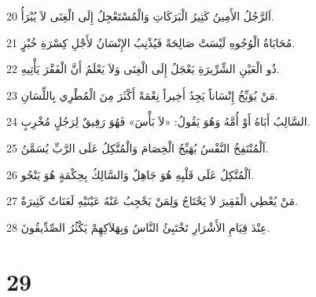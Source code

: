 \par 20 اَلرَّجُلُ الأَمِينُ كَثِيرُ الْبَرَكَاتِ وَالْمُسْتَعْجِلُ إِلَى الْغِنَى لاَ يُبْرَأُ.
\par 21 مُحَابَاةُ الْوُجُوهِ لَيْسَتْ صَالِحَةً فَيُذْنِبُ الإِنْسَانُ لأَجْلِ كِسْرَةِ خُبْزٍ.
\par 22 ذُو الْعَيْنِ الشِّرِّيرَةِ يَعْجَلُ إِلَى الْغِنَى وَلاَ يَعْلَمُ أَنَّ الْفَقْرَ يَأْتِيهِ.
\par 23 مَنْ يُوَبِّخُ إِنْسَاناً يَجِدُ أَخِيراً نِعْمَةً أَكْثَرَ مِنَ الْمُطْرِي بِاللِّسَانِ.
\par 24 السَّالِبُ أَبَاهُ أَوْ أُمَّهُ وَهُوَ يَقُولُ: «لاَ بَأْسَ» فَهُوَ رَفِيقٌ لِرَجُلٍ مُخْرِبٍ.
\par 25 اَلْمُنْتَفِخُ النَّفْسُ يُهَيِّجُ الْخِصَامَ وَالْمُتَّكِلُ عَلَى الرَّبِّ يُسَمَّنُ.
\par 26 اَلْمُتَّكِلُ عَلَى قَلْبِهِ هُوَ جَاهِلٌ وَالسَّالِكُ بِحِكْمَةٍ هُوَ يَنْجُو.
\par 27 مَنْ يُعْطِي الْفَقِيرَ لاَ يَحْتَاجُ وَلِمَنْ يَحْجِبُ عَنْهُ عَيْنَيْهِ لَعَنَاتٌ كَثِيرَةٌ.
\par 28 عِنْدَ قِيَامِ الأَشْرَارِ تَخْتَبِئُ النَّاسُ وَبِهَلاَكِهِمْ يَكْثُرُ الصِّدِّيقُونَ.

\chapter{29}

